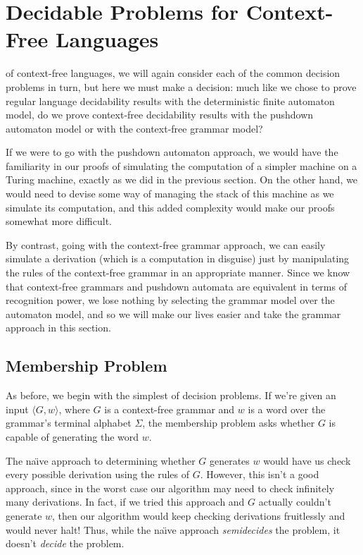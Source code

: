 \section{Decidable Problems for Context-Free Languages}\label{sec:decidableCFL}

 of context-free languages, we will again consider each of the common decision problems in turn, but here we must make a decision: much like we chose to prove regular language decidability results with the deterministic finite automaton model, do we prove context-free decidability results with the pushdown automaton model or with the context-free grammar model?

If we were to go with the pushdown automaton approach, we would have the familiarity in our proofs of simulating the computation of a simpler machine on a Turing machine, exactly as we did in the previous section. On the other hand, we would need to devise some way of managing the stack of this machine as we simulate its computation, and this added complexity would make our proofs somewhat more difficult.

By contrast, going with the context-free grammar approach, we can easily simulate a derivation (which is a computation in disguise) just by manipulating the rules of the context-free grammar in an appropriate manner. Since we know that context-free grammars and pushdown automata are equivalent in terms of recognition power, we lose nothing by selecting the grammar model over the automaton model, and so we will make our lives easier and take the grammar approach in this section.

\subsection*{Membership Problem}

As before, we begin with the simplest of decision problems. If we're given an input $\langle G, w \rangle$, where $G$ is a context-free grammar and $w$ is a word over the grammar's terminal alphabet $\Sigma$, the membership problem asks whether $G$ is capable of generating the word $w$.

The na\"{\i}ve approach to determining whether $G$ generates $w$ would have us check every possible derivation using the rules of $G$. However, this isn't a good approach, since in the worst case our algorithm may need to check infinitely many derivations. In fact, if we tried this approach and $G$ actually couldn't generate $w$, then our algorithm would keep checking derivations fruitlessly and would never halt! Thus, while the na\"{\i}ve approach \emph{semidecides} the problem, it doesn't \emph{decide} the problem.

